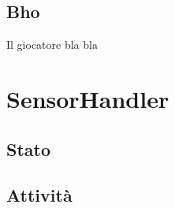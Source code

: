\documentclass[a4paper,11pt]{article}
\begin{document}
\subsection{Bho}
Il giocatore bla bla

\newpage

\section{SensorHandler}

\subsection{Stato}

\subsection{Attività}
\newpage

\renewcommand\thesection{}
\end{document}
